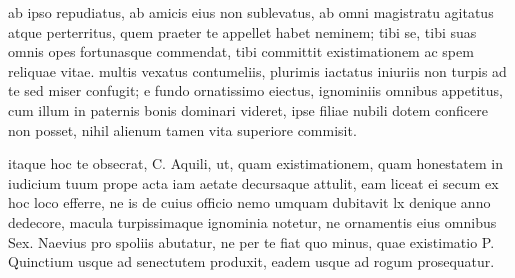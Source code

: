  ab ipso repudiatus, ab amicis eius non sublevatus, ab omni magistratu agitatus atque perterritus, quem praeter te appellet habet neminem; tibi se, tibi suas omnis opes fortunasque commendat, tibi committit existimationem ac spem reliquae vitae. multis vexatus contumeliis, plurimis iactatus iniuriis non turpis ad te sed miser confugit; e fundo ornatissimo eiectus, ignominiis omnibus appetitus, cum illum in paternis bonis dominari videret, ipse filiae nubili dotem conficere non posset, nihil alienum tamen vita superiore commisit.

 itaque hoc te obsecrat, C. Aquili, ut, quam existimationem, quam honestatem in iudicium tuum prope acta iam aetate decursaque attulit, eam liceat ei secum ex hoc loco efferre, ne is de cuius officio nemo umquam dubitavit lx denique anno dedecore, macula turpissimaque ignominia notetur, ne ornamentis eius omnibus Sex. Naevius pro spoliis abutatur, ne per te fiat quo minus, quae existimatio P. Quinctium usque ad senectutem produxit, eadem usque ad rogum prosequatur.
